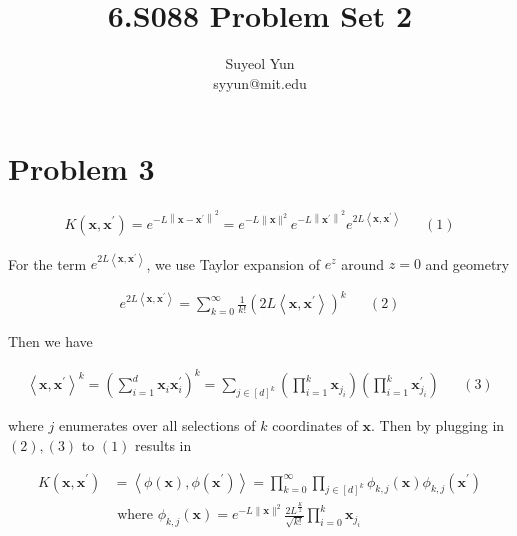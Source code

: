 \documentclass[13pt]{article}
\begin{document}
 
\title{6.S088 Problem Set 2}
\author{Suyeol Yun\\
syyun@mit.edu}
\maketitle
 
\section{Problem 3}
\begin{align*}
    K\left(\mathbf{x}, \mathbf{x}^{\prime}\right)=e^{-L\left\|\mathbf{x} - \mathbf{x}^{\prime}\right\|^2}=e^{-L\|\mathbf{x}\|^2} e^{-L\left\|\mathbf{x}^{\prime}\right\|^2} e^{2L\left\langle\mathbf{x}, \mathbf{x}^{\prime}\right\rangle} && (1)
\end{align*}

For the term $e^{2L\left\langle\mathbf{x}, \mathbf{x}^{\prime}\right\rangle}$, we use Taylor expansion of $e^z$ around $z=0$ and geometry

\begin{align*}
    e^{2L\left\langle\mathbf{x}, \mathbf{x}^{\prime}\right\rangle}=\sum_{k=0}^{\infty} \frac{1}{k !}\left(2L\left\langle\mathbf{x}, \mathbf{x}^{\prime}\right\rangle\right)^k && (2)
\end{align*}

Then we have 

\begin{align*}
    \left\langle\mathbf{x}, \mathbf{x}^{\prime}\right\rangle^k=\left(\sum_{i=1}^d \mathbf{x}_i \mathbf{x}_i^{\prime}\right)^k=\sum_{j \in[d]^k}\left(\prod_{i=1}^k \mathbf{x}_{j_i}\right)\left(\prod_{i=1}^k \mathbf{x}_{j_i}^{\prime}\right) && (3)
\end{align*}

where $j$ enumerates over all selections of $k$ coordinates of $\mathbf{x}$. Then by plugging in $(2), (3)$ to $(1)$ results in

\begin{align*}
    K\left(\mathbf{x}, \mathbf{x}^{\prime}\right)&=\left\langle\phi(\mathbf{x}), \phi\left(\mathbf{x}^{\prime}\right)\right\rangle=\prod_{k=0}^{\infty} \prod_{j \in[d]^k} \phi_{k, j}(\mathbf{x}) \phi_{k, j}\left(\mathbf{x}^{\prime}\right)\\
    &\text{ where }     \phi_{k, j}(\mathbf{x})=e^{-L\|\mathbf{x}\|^2} \frac{2L^{\frac{K}{2}}}{\sqrt{k !}} \prod_{i=0}^k \mathbf{x}_{j_i}
\end{align*}
\end{document}
